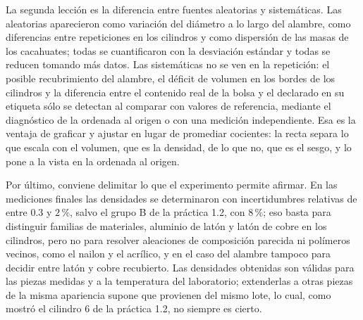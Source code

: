 La segunda lección es la diferencia entre fuentes aleatorias y sistemáticas. Las aleatorias aparecieron como variación del diámetro a lo largo del alambre, como diferencias entre repeticiones en los cilindros y como dispersión de las masas de los cacahuates; todas se cuantificaron con la desviación estándar y todas se reducen tomando más datos. Las sistemáticas no se ven en la repetición: el posible recubrimiento del alambre, el déficit de volumen en los bordes de los cilindros y la diferencia entre el contenido real de la bolsa y el declarado en su etiqueta sólo se detectan al comparar con valores de referencia, mediante el diagnóstico de la ordenada al origen o con una medición independiente. Esa es la ventaja de graficar y ajustar en lugar de promediar cocientes: la recta separa lo que escala con el volumen, que es la densidad, de lo que no, que es el sesgo, y lo pone a la vista en la ordenada al origen.

Por último, conviene delimitar lo que el experimento permite afirmar. En las mediciones finales las densidades se determinaron con incertidumbres relativas de entre $0.3$ y $2\,\%$, salvo el grupo B de la práctica 1.2, con $8\,\%$; eso basta para distinguir familias de materiales, aluminio de latón y latón de cobre en los cilindros, pero no para resolver aleaciones de composición parecida ni polímeros vecinos, como el nailon y el acrílico, y en el caso del alambre tampoco para decidir entre latón y cobre recubierto. Las densidades obtenidas son válidas para las piezas medidas y a la temperatura del laboratorio; extenderlas a otras piezas de la misma apariencia supone que provienen del mismo lote, lo cual, como mostró el cilindro 6 de la práctica 1.2, no siempre es cierto.
